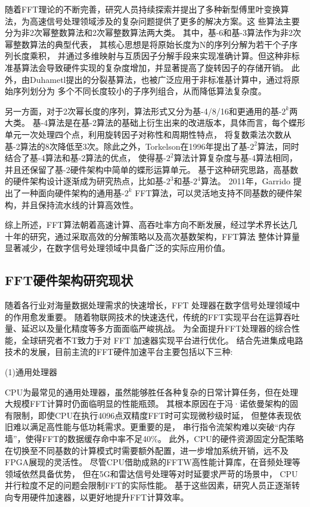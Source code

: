 随着FFT理论的不断完善，研究人员持续探索并提出了多种新型傅里叶变换算法，为高速信号处理领域涉及的复杂问题提供了更多的解决方案。这
些算法主要分为非2次幂整数算法和2次幂整数算法两大类。
其中，基-6\cite{prakash1981new}和基-3\cite{dubois1978new}算法作为非2次幂整数算法的典型代表，
其核心思想是将原始长度为N的序列分解为若干个子序列长度乘积，
并通过多维映射与互质因子分解手段来实现准确计算。但这种非标准基算法会导致硬件实现的复杂度增加，并显著提高了旋转因子的存储开销。
此外，由Duhametl提出的分裂基算法\cite{duhamel1984split}，也被广泛应用于非标准基计算中，通过将原始序列划分为
多个不同长度较小的子序列组合，从而降低算法复杂度。

另一方面，对于2次幂长度的序列，算法形式又分为基-4/8/16和更通用的基-$2^k$两大类。
基-4算法是在基-2算法的基础上衍生出来的改进版本，具体而言，每个蝶形单元一次处理四个点，利用旋转因子对称性和周期性特点，
将复数乘法次数从基-2算法的8次降低至3次。除此之外，Torkelson在1996年提出了基-$2^2$算法，同时结合了基-4算法和基-2算法的优点，
使得基-$2^2$算法计算复杂度与基-4算法相同，并且还保留了基-2硬件架构中简单的蝶形运算单元。
基于这种研究思路，高基数的硬件架构设计逐渐成为研究热点，比如基-$2^3$\cite{adiono200964}和基-$2^4$\cite{fan2006low}算法。
2011年，Garrido\cite{garrido2011pipelined}
提出了一种面向硬件架构的通用基-$2^k$ FFT算法，可以灵活地支持不同基数的硬件架构，并且保持流水线的计算高效性。

综上所述，FFT算法朝着高速计算、高吞吐率方向不断发展，经过学术界长达几十年的研究，通过采取高效的分解策略以及高次基数架构，FFT算法
整体计算量显著减少，在数字信号处理领域中具备广泛的实际应用价值。

\subsection[\hspace{-2pt}FFT加速器硬件研究现状]{{ \hspace{-8pt}}FFT硬件架构研究现状}\label{section 1-2-1}

随着各行业对海量数据处理需求的快速增长，FFT 处理器在数字信号处理领域中的作用愈发重要。
随着物联网技术的快速迭代，传统的FFT实现平台在运算吞吐量、延迟以及量化精度等多方面面临严峻挑战。
为全面提升FFT处理器的综合性能，全球研究者不T致力于对 FFT 加速器实现平台进行优化。
结合先进集成电路技术的发展，目前主流的FFT硬件加速平台主要包括以下三种:

(1)通用处理器

CPU为最常见的通用处理器，虽然能够胜任各种复杂的日常计算任务，但在处理大规模FFT计算时仍面临明显的性能瓶颈。
其根本原因在于冯·诺依曼架构\cite{DZJY202311004}的固有限制，即使CPU在执行4096点双精度FFT时可实现微秒级时延，
但整体表现依旧难以满足高性能与低功耗需求。更重要的是，
串行指令流架构难以突破“内存墙”，使得FFT的数据缓存命中率不足40\%。
此外，CPU的硬件资源固定分配策略在切换至不同基数的计算模式时需要额外配置，进一步增加系统开销，远不及FPGA展现的灵活性。
尽管CPU借助成熟的FFTW高性能计算库，在音频处理等领域依然具备优势，
但在5G和雷达信号处理等对时延要求严苛的场景中，
CPU并行粒度不足的问题会限制FFT的实际性能\cite{1024436892.nh}。
基于这些因素，研究人员正逐渐转向专用硬件加速器，以更好地提升FFT计算效率。

